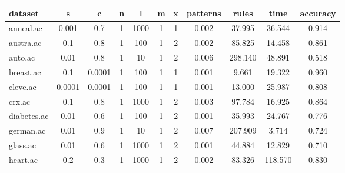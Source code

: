 \begin{table}[htbp]
	\centering
		\begin{tabular}{|l|c|c|c|c|c|c|c|c|c|c|}
		\hline
		\textbf{dataset}	& \textbf{s}	& \textbf{c}	& \textbf{n}	& \textbf{l}	& \textbf{m}	& \textbf{x}	& \textbf{patterns}	& \textbf{rules}	& \textbf{time}	& \textbf{accuracy}	\\
		\hline
		anneal.ac      & 0.001    & 0.7         & 1              & 1000                & 1             & 1             & 0.002          & 37.995         & 36.544         & 0.914          \\
		\hline
		austra.ac      & 0.1      & 0.8         & 1              & 100                 & 1             & 2             & 0.002          & 85.825         & 14.458         & 0.861          \\
		\hline
		auto.ac        & 0.01     & 0.8         & 1              & 10                  & 1             & 2             & 0.006          & 298.140        & 48.891         & 0.518          \\
		\hline
		breast.ac      & 0.1      & 0.0001      & 1              & 100                 & 1             & 1             & 0.001          & 9.661          & 19.322         & 0.960          \\
		\hline
		cleve.ac       & 0.0001   & 0.0001      & 1              & 100                 & 1             & 1             & 0.001          & 13.000         & 25.987         & 0.808          \\
		\hline
		crx.ac         & 0.1      & 0.8         & 1              & 1000                & 1             & 2             & 0.003          & 97.784         & 16.925         & 0.864          \\
		\hline
		diabetes.ac    & 0.01     & 0.6         & 1              & 100                 & 1             & 2             & 0.001          & 35.993         & 24.767         & 0.776          \\
		\hline
		german.ac      & 0.01     & 0.9         & 1              & 10                  & 1             & 2             & 0.007          & 207.909        & 3.714          & 0.724          \\
		\hline
		glass.ac       & 0.01     & 0.6         & 1              & 1000                & 1             & 2             & 0.001          & 44.884         & 12.829         & 0.710          \\
		\hline
		heart.ac       & 0.2      & 0.3         & 1              & 1000                & 1             & 2             & 0.002          & 83.326         & 118.570        & 0.830          \\

\end{tabular}
\end{table}
